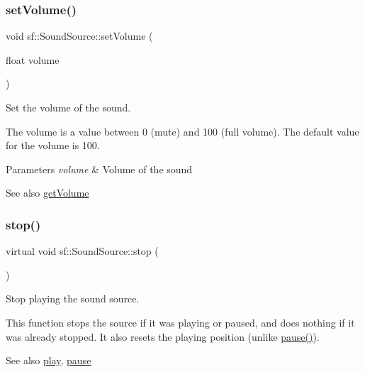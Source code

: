 \subsubsection{\texorpdfstring{setVolume()}{setVolume()}}
{\footnotesize\ttfamily void sf\+::\+Sound\+Source\+::set\+Volume (\begin{DoxyParamCaption}\item[{float}]{volume }\end{DoxyParamCaption})}



Set the volume of the sound. 

The volume is a value between 0 (mute) and 100 (full volume). The default value for the volume is 100.


\begin{DoxyParams}{Parameters}
{\em volume} & Volume of the sound\\
\hline
\end{DoxyParams}
\begin{DoxySeeAlso}{See also}
\mbox{\hyperlink{classsf_1_1_sound_source_a04243fb5edf64561689b1d58953fc4ce}{get\+Volume}} \begin{DoxyVerb}\end{DoxyVerb}
 
\end{DoxySeeAlso}
\mbox{\label{classsf_1_1_sound_source_a06501a25b12376befcc7ee1ed4865fda}} 
\subsubsection{\texorpdfstring{stop()}{stop()}}
{\footnotesize\ttfamily virtual void sf\+::\+Sound\+Source\+::stop (\begin{DoxyParamCaption}{ }\end{DoxyParamCaption})\hspace{0.3cm}{\ttfamily [pure virtual]}}



Stop playing the sound source. 

This function stops the source if it was playing or paused, and does nothing if it was already stopped. It also resets the playing position (unlike \mbox{\hyperlink{classsf_1_1_sound_source_a21553d4e8fcf136231dd8c7ad4630aba}{pause()}}).

\begin{DoxySeeAlso}{See also}
\mbox{\hyperlink{classsf_1_1_sound_source_a6e1bbb1f247ed8743faf3b1ed6f2bc21}{play}}, \mbox{\hyperlink{classsf_1_1_sound_source_a21553d4e8fcf136231dd8c7ad4630aba}{pause}} \begin{DoxyVerb}\end{DoxyVerb}
 
\end{DoxySeeAlso}


